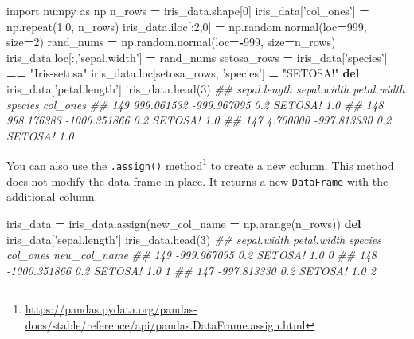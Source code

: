 \documentclass[12pt,krantz2]{krantz}
\makeatletter
\newenvironment{Shaded}{\begin{snugshade}}{\end{snugshade}}
\newcommand{\CommentTok}[1]{\textcolor[rgb]{0.37,0.37,0.37}{\textit{#1}}}
\newcommand{\DecValTok}[1]{\textcolor[rgb]{0.06,0.06,0.06}{#1}}
\newcommand{\FloatTok}[1]{\textcolor[rgb]{0.06,0.06,0.06}{#1}}
\newcommand{\ImportTok}[1]{#1}
\newcommand{\KeywordTok}[1]{\textcolor[rgb]{0.27,0.27,0.27}{\textbf{#1}}}
\newcommand{\NormalTok}[1]{#1}
\newcommand{\OperatorTok}[1]{\textcolor[rgb]{0.43,0.43,0.43}{\textbf{#1}}}
\newcommand{\StringTok}[1]{\textcolor[rgb]{0.5,0.5,0.5}{#1}}
\renewcommand{\href}[2]{#2\footnote{\url{#1}}}
\newenvironment{kframe}{%
\medskip{}
\setlength{\fboxsep}{.8em}
 \def\at@end@of@kframe{}%
 \ifinner\ifhmode%
  \def\at@end@of@kframe{\end{minipage}}%
  \begin{minipage}{\columnwidth}%
 \fi\fi%
 \def\FrameCommand##1{\hskip\@totalleftmargin \hskip-\fboxsep
 \colorbox{shadecolor}{##1}\hskip-\fboxsep
     \hskip-\linewidth \hskip-\@totalleftmargin \hskip\columnwidth}%
 \MakeFramed {\advance\hsize-\width
   \@totalleftmargin\z@ \linewidth\hsize
   \@setminipage}}%
 {\par\unskip\endMakeFramed%
 \at@end@of@kframe}
\renewenvironment{Shaded}{\begin{kframe}}{\end{kframe}}
\makeatother
\begin{document}
\begin{Shaded}
\begin{Highlighting}[]
\ImportTok{import}\NormalTok{ numpy }\ImportTok{as}\NormalTok{ np}
\NormalTok{n_rows }\OperatorTok{=}\NormalTok{ iris_data.shape[}\DecValTok{0}\NormalTok{]}
\NormalTok{iris_data[}\StringTok{'col_ones'}\NormalTok{] }\OperatorTok{=}\NormalTok{ np.repeat(}\FloatTok{1.0}\NormalTok{, n_rows)}
\NormalTok{iris_data.iloc[:}\DecValTok{2}\NormalTok{,}\DecValTok{0}\NormalTok{] }\OperatorTok{=}\NormalTok{  np.random.normal(loc}\OperatorTok{=}\DecValTok{999}\NormalTok{, size}\OperatorTok{=}\DecValTok{2}\NormalTok{)}
\NormalTok{rand_nums }\OperatorTok{=}\NormalTok{ np.random.normal(loc}\OperatorTok{=-}\DecValTok{999}\NormalTok{, size}\OperatorTok{=}\NormalTok{n_rows)}
\NormalTok{iris_data.loc[:,}\StringTok{'sepal.width'}\NormalTok{] }\OperatorTok{=}\NormalTok{ rand_nums}
\NormalTok{setosa_rows }\OperatorTok{=}\NormalTok{ iris_data[}\StringTok{'species'}\NormalTok{] }\OperatorTok{==} \StringTok{"Iris-setosa"}
\NormalTok{iris_data.loc[setosa_rows, }\StringTok{'species'}\NormalTok{] }\OperatorTok{=} \StringTok{"SETOSA!"}
\KeywordTok{del}\NormalTok{ iris_data[}\StringTok{'petal.length'}\NormalTok{]}
\NormalTok{iris_data.head(}\DecValTok{3}\NormalTok{)}
\CommentTok{##      sepal.length  sepal.width  petal.width  species  col_ones}
\CommentTok{## 149    999.061532  -999.967095          0.2  SETOSA!       1.0}
\CommentTok{## 148    998.176383 -1000.351866          0.2  SETOSA!       1.0}
\CommentTok{## 147      4.700000  -997.813330          0.2  SETOSA!       1.0}
\end{Highlighting}
\end{Shaded}

You can also use the \href{https://pandas.pydata.org/pandas-docs/stable/reference/api/pandas.DataFrame.assign.html}{\texttt{.assign()} method} to create a new column. This method does not modify the data frame in place. It returns a new \texttt{DataFrame} with the additional column.

\begin{Shaded}
\begin{Highlighting}[]
\NormalTok{iris_data }\OperatorTok{=}\NormalTok{ iris_data.assign(new_col_name }\OperatorTok{=}\NormalTok{ np.arange(n_rows))}
\KeywordTok{del}\NormalTok{ iris_data[}\StringTok{'sepal.length'}\NormalTok{]}
\NormalTok{iris_data.head(}\DecValTok{3}\NormalTok{)}
\CommentTok{##      sepal.width  petal.width  species  col_ones  new_col_name}
\CommentTok{## 149  -999.967095          0.2  SETOSA!       1.0             0}
\CommentTok{## 148 -1000.351866          0.2  SETOSA!       1.0             1}
\CommentTok{## 147  -997.813330          0.2  SETOSA!       1.0             2}
\end{Highlighting}
\end{Shaded}
\end{document}
